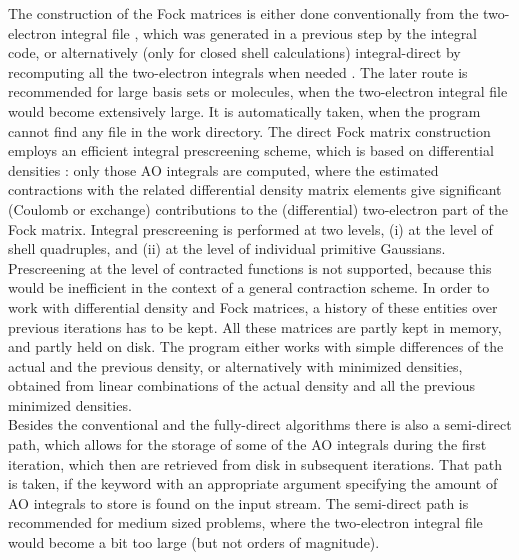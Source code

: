 The construction of the Fock
matrices is either done conventionally from the two-{}electron integral
file ,
which was generated in a previous step by the 
integral code, or alternatively (only for closed shell calculations)
integral-direct by recomputing all the
two-{}electron integrals when needed \cite{AlmlofFaegriKorsell_DirSCF}.
The later route is recommended for
large basis sets or molecules, when the two-{}electron integral file would
become extensively large. It is automatically taken, when the 
program cannot find any  file in the work directory.
The direct Fock matrix construction employs an efficient integral prescreening
scheme, which is based on differential densities
\cite{CremerGauss_SCFprescreening,HaeserAhlrichs_SCFprescreening}: only
those AO integrals are computed, where the estimated contractions with the
related differential density matrix elements give significant (Coulomb or
exchange) contributions to the (differential) two-{}electron part of the Fock
matrix. Integral prescreening is performed at two levels, (i) at the level
of shell quadruples, and (ii) at the level of individual primitive Gaussians.
Prescreening at the level of contracted functions is not supported, because
this would be inefficient in the context of a general contraction scheme.
In order to work with differential density and Fock matrices, a history of
these entities over previous iterations has to be kept. All these matrices
are partly kept in memory, and partly held on disk. The  program
either works with simple differences of the actual and the previous density,
or alternatively with minimized densities, obtained from linear combinations
of the actual density and all the previous minimized densities. \\
Besides the conventional and the fully-direct algorithms there is also a
semi-direct path, which allows for the storage of some of the AO integrals
during the first iteration, which then are retrieved from disk in subsequent
iterations. That path is taken, if the keyword  with an
appropriate
argument specifying the amount of AO integrals to store is found on the
input stream. The semi-direct path is recommended for medium sized problems,
where the two-{}electron integral file would become a bit too large (but not
orders of magnitude).

